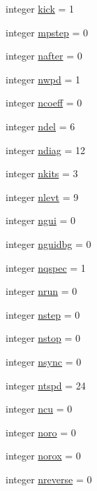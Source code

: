 \begin{DoxyCompactItemize}
\item 
integer \hyperlink{classpumamod_a3a1c81fe64adaf2b041e815e66e59e8d}{kick} = 1
\item 
integer \hyperlink{classpumamod_ae82bde2eb42c2fab72e9d6c5d7b009f7}{mpstep} = 0
\item 
integer \hyperlink{classpumamod_a865b5e1934a6f612b35bade36c2d15bd}{nafter} = 0
\item 
integer \hyperlink{classpumamod_a0b0e7fc78c5ac39d54ce42a9902447a8}{nwpd} = 1
\item 
integer \hyperlink{classpumamod_ab5156c8a13ca4542d36017a32cb2e276}{ncoeff} = 0
\item 
integer \hyperlink{classpumamod_a9eabecdccc9c5124168c5d89bc15a1d5}{ndel} = 6
\item 
integer \hyperlink{classpumamod_a54f043f98baef026666945f1440f91b5}{ndiag} = 12
\item 
integer \hyperlink{classpumamod_ae5867c6d3c10e9065d7b541ca679d112}{nkits} = 3
\item 
integer \hyperlink{classpumamod_a6d50c7a2bbb6196702e7f4f4a0dc5be8}{nlevt} = 9
\item 
integer \hyperlink{classpumamod_a32948de893d3d7aff01b6372d649f0f6}{ngui} = 0
\item 
integer \hyperlink{classpumamod_a87bc07500cf139d8845b380e0dfbe14f}{nguidbg} = 0
\item 
integer \hyperlink{classpumamod_aaee4fe4165cbc11489f204620de859b8}{nqspec} = 1
\item 
integer \hyperlink{classpumamod_a461c71616d123104512f1679325a8ecf}{nrun} = 0
\item 
integer \hyperlink{classpumamod_a856ad9c4756a0ccbf7fd325b06f1f900}{nstep} = 0
\item 
integer \hyperlink{classpumamod_a01f12039746034a94bf226982a6d64ee}{nstop} = 0
\item 
integer \hyperlink{classpumamod_aed2697cde4ae8454c1807fba6dece761}{nsync} = 0
\item 
integer \hyperlink{classpumamod_a4e689422a383ca3ce7c337c46c66dc71}{ntspd} = 24
\item 
integer \hyperlink{classpumamod_a137990cf922778de47c453b0556f611a}{ncu} = 0
\item 
integer \hyperlink{classpumamod_ae291f08906944ef6e0aff0307de74028}{noro} = 0
\item 
integer \hyperlink{classpumamod_a2724444f4ea0cd1c9ddf8f7b40a0cd5c}{norox} = 0
\item 
integer \hyperlink{classpumamod_ad9f0e1be51ddecef14ef8259d22f110b}{nreverse} = 0

\end{DoxyCompactItemize}
